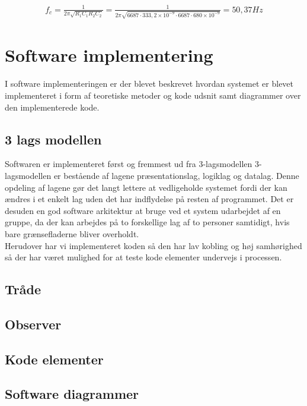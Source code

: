 \begin{align}
f_{c} = \frac{1}{2\pi \sqrt{R_{1}C_{1}R_{2}C_{2}}} = \frac{1}{2\pi \sqrt{6687 \cdot 333,2\times 10^{-9} \cdot 6687 \cdot 680\times 10^{-9}}} = 50,37 Hz
	\label{cutoff}
\end{align}

\section{Software implementering}
I software implementeringen er der blevet beskrevet hvordan systemet er blevet implementeret i form af teoretiske metoder og kode udsnit samt diagrammer over den implementerede kode.
\subsection{3 lags modellen}
Softwaren er implementeret først og fremmest ud fra 3-lagsmodellen 3-lagsmodellen er
bestående af lagene præsentationslag, logiklag og datalag. Denne opdeling af lagene gør
det langt lettere at vedligeholde systemet fordi der kan ændres i et enkelt lag uden det har
indflydelse på resten af programmet.
Det er desuden en god software arkitektur at bruge ved et system udarbejdet af en gruppe,
da der kan arbejdes på to forskellige lag af to personer samtidigt, hvis bare grænsefladerne
bliver overholdt.\\
Herudover har vi implementeret koden så den har lav kobling og høj samhørighed så der har været mulighed for at teste kode elementer undervejs i processen. 

\subsection{Tråde}

\subsection{Observer}

\subsection{Kode elementer}

\subsection{Software diagrammer}

